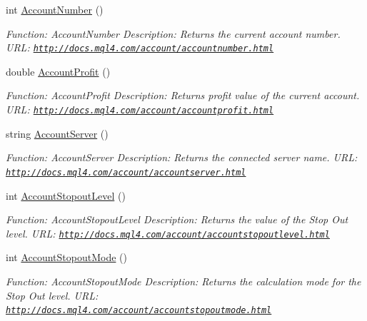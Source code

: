 \begin{DoxyCompactItemize}
int \hyperlink{class_m_q_l4_c_sharp_1_1_base_1_1_m_q_l_base_a7f7a189758f8804a27c686a0b9dc4770}{Account\+Number} ()
\begin{DoxyCompactList}\small\item\em Function\+: Account\+Number Description\+: Returns the current account number. U\+RL\+: \href{http://docs.mql4.com/account/accountnumber.html}{\tt http\+://docs.\+mql4.\+com/account/accountnumber.\+html} \end{DoxyCompactList}\item 
double \hyperlink{class_m_q_l4_c_sharp_1_1_base_1_1_m_q_l_base_a5f69fd4445653a09dc95a4d62a591b71}{Account\+Profit} ()
\begin{DoxyCompactList}\small\item\em Function\+: Account\+Profit Description\+: Returns profit value of the current account. U\+RL\+: \href{http://docs.mql4.com/account/accountprofit.html}{\tt http\+://docs.\+mql4.\+com/account/accountprofit.\+html} \end{DoxyCompactList}\item 
string \hyperlink{class_m_q_l4_c_sharp_1_1_base_1_1_m_q_l_base_a06e7f7f46a19cd5a65baab93bfcb5546}{Account\+Server} ()
\begin{DoxyCompactList}\small\item\em Function\+: Account\+Server Description\+: Returns the connected server name. U\+RL\+: \href{http://docs.mql4.com/account/accountserver.html}{\tt http\+://docs.\+mql4.\+com/account/accountserver.\+html} \end{DoxyCompactList}\item 
int \hyperlink{class_m_q_l4_c_sharp_1_1_base_1_1_m_q_l_base_a1d0da9d7137bef965b1ee7809530e277}{Account\+Stopout\+Level} ()
\begin{DoxyCompactList}\small\item\em Function\+: Account\+Stopout\+Level Description\+: Returns the value of the Stop Out level. U\+RL\+: \href{http://docs.mql4.com/account/accountstopoutlevel.html}{\tt http\+://docs.\+mql4.\+com/account/accountstopoutlevel.\+html} \end{DoxyCompactList}\item 
int \hyperlink{class_m_q_l4_c_sharp_1_1_base_1_1_m_q_l_base_aa59d9f751e714a6354530a3c46d4ce1f}{Account\+Stopout\+Mode} ()
\begin{DoxyCompactList}\small\item\em Function\+: Account\+Stopout\+Mode Description\+: Returns the calculation mode for the Stop Out level. U\+RL\+: \href{http://docs.mql4.com/account/accountstopoutmode.html}{\tt http\+://docs.\+mql4.\+com/account/accountstopoutmode.\+html} \end{DoxyCompactList}\item 

\end{DoxyCompactItemize}
